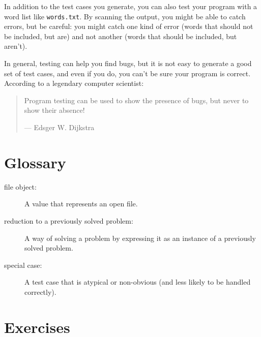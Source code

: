 \documentclass[10pt]{book}
\begin{document}
In addition to the test cases you generate, you can also test
your program with a word list like {\tt words.txt}.  By scanning
the output, you might be able to catch errors, but be careful:
you might catch one kind of error (words that should not be
included, but are) and not another (words that should be included,
but aren't).

In general, testing can help you find bugs, but it is not easy to
generate a good set of test cases, and even if you do, you can't
be sure your program is correct.
According to a legendary computer scientist:

\begin{quote}
Program testing can be used to show the presence of bugs, but never to
show their absence!

--- Edsger W. Dijkstra
\end{quote}


\section{Glossary}

\begin{description}

\item[file object:] A value that represents an open file.

\item[reduction to a previously solved problem:] A way of solving a
  problem by expressing it as an instance of a previously solved
  problem.  

\item[special case:] A test case that is atypical or non-obvious
(and less likely to be handled correctly).

\end{description}


\section{Exercises}
\end{document}
